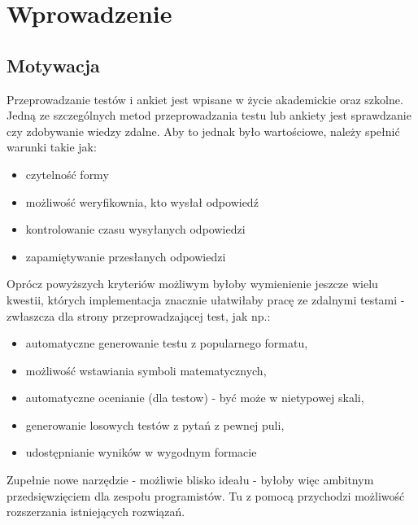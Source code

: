 \chapter{Wprowadzenie}%
\section{Motywacja}
Przeprowadzanie testów i ankiet jest wpisane w życie akademickie oraz szkolne. Jedną ze szczególnych metod przeprowadzania testu lub ankiety jest sprawdzanie czy zdobywanie wiedzy zdalne.
Aby to jednak było wartościowe, należy spełnić warunki takie jak:
\begin{itemize}
\item czytelność formy
\item możliwość weryfikownia, kto wysłał odpowiedź
\item kontrolowanie czasu wysyłanych odpowiedzi
\item zapamiętywanie przesłanych odpowiedzi
\end{itemize}
Oprócz powyższych kryteriów możliwym byłoby wymienienie jeszcze wielu kwestii, których implementacja znacznie ułatwiłaby pracę ze zdalnymi testami - zwłaszcza dla strony przeprowadzającej test, jak np.:
\begin{itemize}
\item automatyczne generowanie testu z popularnego formatu,
\item możliwość wstawiania symboli matematycznych,
\item automatyczne ocenianie (dla testow)  - być może w nietypowej skali,
\item generowanie losowych testów z pytań z pewnej puli,
\item udostępnianie wyników w wygodnym formacie
\end{itemize}
Zupełnie nowe narzędzie - możliwie blisko ideału - byłoby więc ambitnym przedsięwzięciem dla zespołu programistów. Tu z pomocą przychodzi możliwość rozszerzania istniejących rozwiązań.

